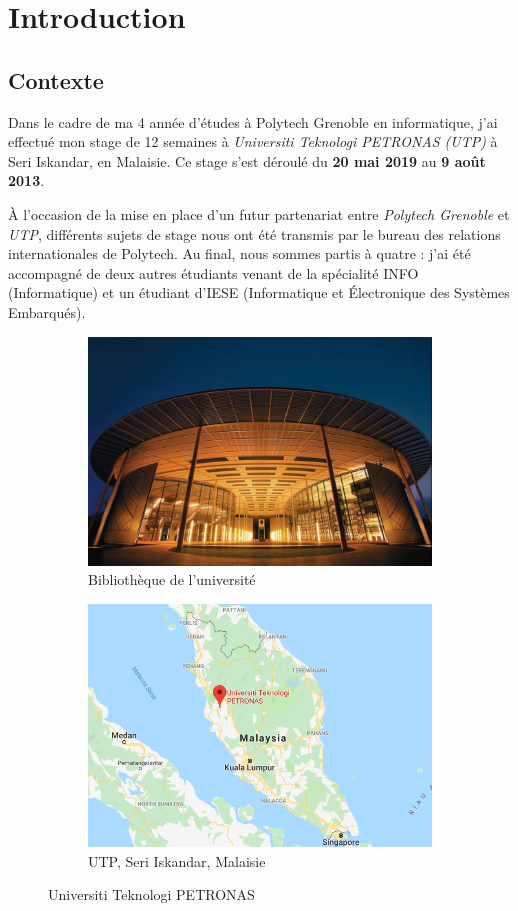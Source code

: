 \chapter{Introduction}

\section{Contexte}

Dans le cadre de ma 4 année d'études à Polytech Grenoble en informatique, j'ai effectué mon stage de 12 semaines à \textit{Universiti Teknologi PETRONAS (UTP)} à Seri Iskandar, en Malaisie. Ce stage s'est déroulé du \textbf{20 mai 2019} au \textbf{9 août 2013}.

À l'occasion de la mise en place d'un futur partenariat entre \textit{Polytech Grenoble} et \textit{UTP}, différents sujets de stage nous ont été transmis par le bureau des relations internationales de Polytech. Au final, nous sommes partis à quatre : j'ai été accompagné de deux autres étudiants venant de la spécialité INFO (Informatique) et un étudiant d'IESE (Informatique et Électronique des Systèmes Embarqués).


\begin{figure}[h]
  \centering
  \begin{subfigure}{.5\textwidth}
    \centering
    \includegraphics[width=.8\linewidth]{content/imgs/utp.jpg}
    \caption{Bibliothèque de l'université}
  \end{subfigure}%
  \begin{subfigure}{.5\textwidth}
    \centering
    \includegraphics[width=.8\linewidth]{content/imgs/map.png}
    \caption{UTP, Seri Iskandar, Malaisie}
  \end{subfigure}
  \caption{Universiti Teknologi PETRONAS}
\end{figure}




